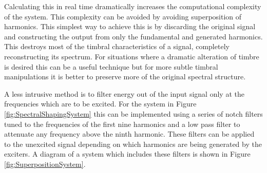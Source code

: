 		Calculating this in real time dramatically increases the computational complexity of the system. This
		complexity can be avoided by avoiding superposition of harmonics. This simplest way to achieve this is by
		discarding the original signal and constructing the output from only the fundamental and generated
		harmonics. This destroys most of the timbral characteristics of a signal, completely reconstructing its
		spectrum. For situations where a dramatic alteration of timbre is desired this can be a useful technique
		but for more subtle timbral manipulations it is better to preserve more of the original spectral structure.

		A less intrusive method is to filter energy out of the input signal only at the frequencies which are to be
		excited. For the system in Figure \ref{fig:SpectralShapingSystem} this can be implemented using a series of
		notch filters tuned to the frequencies of the first nine harmonics and a low pass filter to attenuate any
		frequency above the ninth harmonic. These filters can be applied to the unexcited signal depending on which
		harmonics are being generated by the exciters. A diagram of a system which includes these filters is shown
		in Figure \ref{fig:SuperpositionSystem}.

